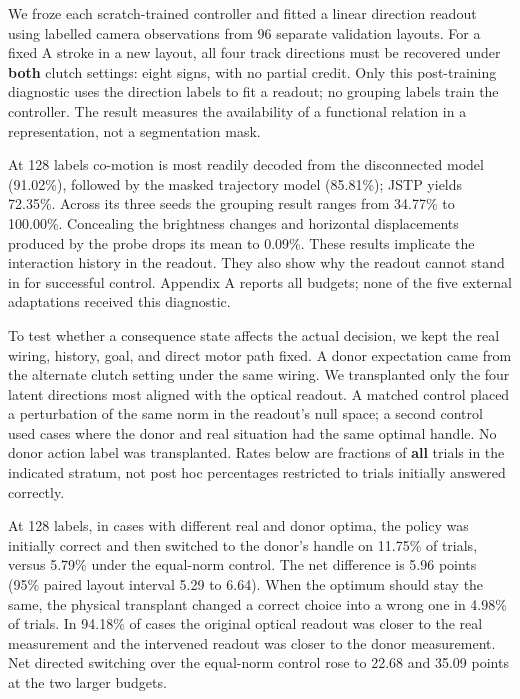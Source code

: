 \documentclass[11pt]{article}
\begin{document}
We froze each scratch-trained controller and fitted a linear direction readout using labelled camera observations from 96 separate validation layouts. For a fixed A stroke in a new layout, all four track directions must be recovered under \textbf{both} clutch settings: eight signs, with no partial credit. Only this post-training diagnostic uses the direction labels to fit a readout; no grouping labels train the controller. The result measures the availability of a functional relation in a representation, not a segmentation mask.

At 128 labels co-motion is most readily decoded from the disconnected model (91.02\%), followed by the masked trajectory model (85.81\%); JSTP yields 72.35\%. Across its three seeds the grouping result ranges from 34.77\% to 100.00\%. Concealing the brightness changes and horizontal displacements produced by the probe drops its mean to 0.09\%. These results implicate the interaction history in the readout. They also show why the readout cannot stand in for successful control. Appendix A reports all budgets; none of the five external adaptations received this diagnostic.

To test whether a consequence state affects the actual decision, we kept the real wiring, history, goal, and direct motor path fixed. A donor expectation came from the alternate clutch setting under the same wiring. We transplanted only the four latent directions most aligned with the optical readout. A matched control placed a perturbation of the same norm in the readout's null space; a second control used cases where the donor and real situation had the same optimal handle. No donor action label was transplanted. Rates below are fractions of \textbf{all} trials in the indicated stratum, not post hoc percentages restricted to trials initially answered correctly.

At 128 labels, in cases with different real and donor optima, the policy was initially correct and then switched to the donor's handle on 11.75\% of trials, versus 5.79\% under the equal-norm control. The net difference is 5.96 points (95\% paired layout interval 5.29 to 6.64). When the optimum should stay the same, the physical transplant changed a correct choice into a wrong one in 4.98\% of trials. In 94.18\% of cases the original optical readout was closer to the real measurement and the intervened readout was closer to the donor measurement. Net directed switching over the equal-norm control rose to 22.68 and 35.09 points at the two larger budgets.
\end{document}
